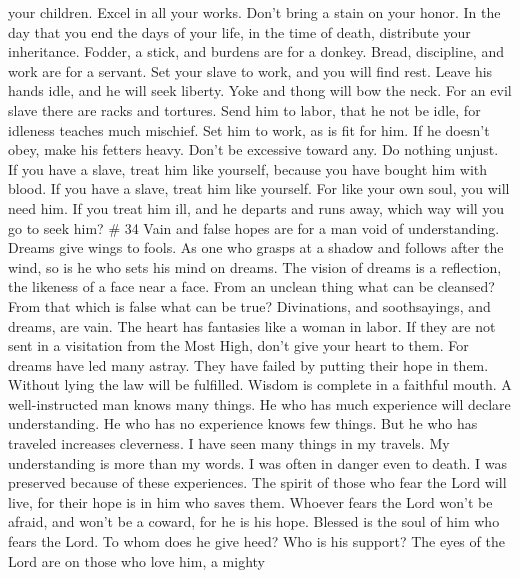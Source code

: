 your children.  Excel in all your works. Don't bring a
stain on your honor.  In the day that you end the days of
your life, in the time of death, distribute your inheritance.
 Fodder, a stick, and burdens are for a donkey. Bread,
discipline, and work are for a servant.  Set your slave to
work, and you will find rest. Leave his hands idle, and he will seek
liberty.  Yoke and thong will bow the neck. For an evil
slave there are racks and tortures.  Send him to labor,
that he not be idle, for idleness teaches much mischief. 
Set him to work, as is fit for him. If he doesn't obey, make his fetters
heavy.  Don't be excessive toward any. Do nothing unjust.
 If you have a slave, treat him like yourself, because you
have bought him with blood.  If you have a slave, treat him
like yourself. For like your own soul, you will need him. If you treat
him ill, and he departs and runs away,  which way will you
go to seek him? \# 34  Vain and false hopes are for a man
void of understanding. Dreams give wings to fools.  As one
who grasps at a shadow and follows after the wind, so is he who sets his
mind on dreams.  The vision of dreams is a reflection, the
likeness of a face near a face.  From an unclean thing what
can be cleansed? From that which is false what can be true? 
Divinations, and soothsayings, and dreams, are vain. The heart has
fantasies like a woman in labor.  If they are not sent in a
visitation from the Most High, don't give your heart to them.
 For dreams have led many astray. They have failed by
putting their hope in them.  Without lying the law will be
fulfilled. Wisdom is complete in a faithful mouth.  A
well-instructed man knows many things. He who has much experience will
declare understanding.  He who has no experience knows few
things. But he who has traveled increases cleverness.  I
have seen many things in my travels. My understanding is more than my
words.  I was often in danger even to death. I was
preserved because of these experiences.  The spirit of
those who fear the Lord will live, for their hope is in him who saves
them.  Whoever fears the Lord won't be afraid, and won't be
a coward, for he is his hope.  Blessed is the soul of him
who fears the Lord. To whom does he give heed? Who is his support?
 The eyes of the Lord are on those who love him, a mighty
